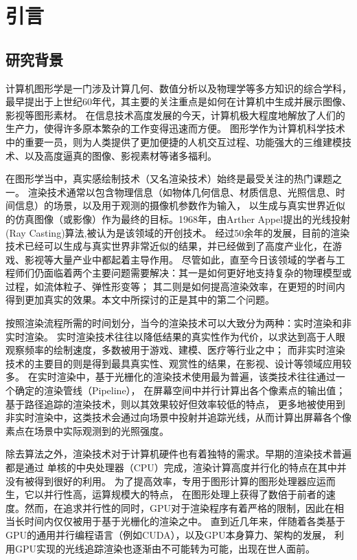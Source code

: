 \chapter{引言}
\label{cha:introduction}

\section{研究背景}

计算机图形学是一门涉及计算几何、数值分析以及物理学等多方知识的综合学科，最早提出于上世纪60年代，其主要的关注重点是如何在计算机中生成并展示图像、影视等图形素材。
在信息技术高度发展的今天，计算机极大程度地解放了人们的生产力，使得许多原本繁杂的工作变得迅速而方便。
图形学作为计算机科学技术中的重要一员，则为人类提供了更加便捷的人机交互过程、功能强大的三维建模技术、以及高度逼真的图像、影视素材等诸多福利。

在图形学当中，真实感绘制技术（又名渲染技术）始终是最受关注的热门课题之一。
渲染技术通常以包含物理信息（如物体几何信息、材质信息、光照信息、时间信息）的场景，以及用于观测的摄像机参数作为输入，
以生成与真实世界近似的仿真图像（或影像）作为最终的目标。1968年，由Arther Appel提出的光线投射(Ray Casting)算法\cite{???},被认为是该领域的开创技术。
经过50余年的发展，目前的渲染技术已经可以生成与真实世界非常近似的结果，并已经做到了高度产业化，在游戏、影视等大量产业中都起着主导作用。
尽管如此，直至今日该领域的学者与工程师们仍面临着两个主要问题需要解决：其一是如何更好地支持复杂的物理模型或过程，如流体粒子、弹性形变等；
其二则是如何提高渲染效率，在更短的时间内得到更加真实的效果。本文中所探讨的正是其中的第二个问题。

按照渲染流程所需的时间划分，当今的渲染技术可以大致分为两种：实时渲染和非实时渲染。
实时渲染技术往往以降低结果的真实性作为代价，以求达到高于人眼观察频率的绘制速度，多数被用于游戏、建模、医疗等行业之中；
而非实时渲染技术的主要目的则是得到最具真实性、观赏性的结果，在影视、设计等领域应用较多。
在实时渲染中，基于光栅化的渲染技术使用最为普遍，该类技术往往通过一个确定的渲染管线（Pipeline），
在屏幕空间中并行计算出各个像素点的输出值；基于路径追踪的渲染技术，则以其效果较好但效率较低的特点，
更多地被使用到非实时渲染中，这类技术会通过向场景中投射并追踪光线，从而计算出屏幕各个像素点在场景中实际观测到的光照强度。

除去算法之外，渲染技术对于计算机硬件也有着独特的需求。早期的渲染技术普遍都是通过
单核的中央处理器（CPU）完成，渲染计算高度并行化的特点在其中并没有被得到很好的利用。
为了提高效率，专用于图形计算的图形处理器应运而生，它以并行性高，运算规模大的特点，
在图形处理上获得了数倍于前者的速度。然而，在追求并行性的同时，GPU对于渲染程序有着严格的限制，因此在相当长时间内仅仅被用于基于光栅化的渲染之中。
直到近几年来，伴随着各类基于GPU的通用并行编程语言（例如CUDA），以及GPU本身算力、架构的发展，
利用GPU实现的光线追踪渲染也逐渐由不可能转为可能，出现在世人面前。

